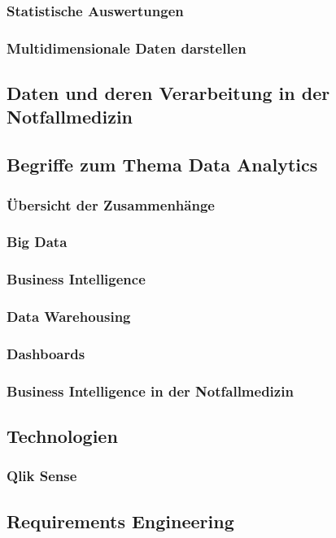 \documentclass[11pt]{article}
\begin{document}
\subsubsection{Statistische Auswertungen}
\subsubsection{Multidimensionale Daten darstellen}
\subsection{Daten und deren Verarbeitung in der Notfallmedizin} %
\subsection{Begriffe zum Thema Data Analytics}
\subsubsection{Übersicht der Zusammenhänge}
\subsubsection{Big Data}
\subsubsection{Business Intelligence}
\subsubsection{Data Warehousing}
\subsubsection{Dashboards}
\subsubsection{Business Intelligence in der Notfallmedizin}
\subsection{Technologien}
\subsubsection{Qlik Sense}
\subsection{Requirements Engineering}
\end{document}
